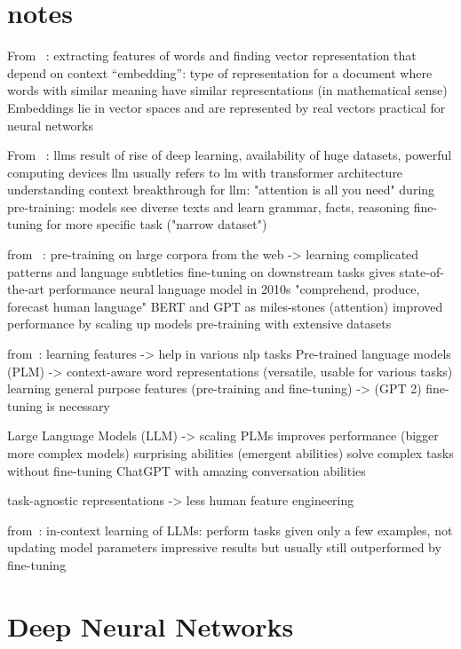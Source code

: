 \section{notes}
From ~\autocite{quadarLM2020}:
extracting features of words and finding vector representation that depend on context
\enquote{embedding}: type of representation for a document where words with similar meaning have similar representations (in mathematical sense)
Embeddings lie in vector spaces and are represented by real vectors
practical for neural networks

From ~\autocite{Hadi_2023}:
\gls{llm}s result of rise of deep learning, availability of huge datasets, powerful computing devices
\gls{llm} usually refers to lm with transformer architecture
understanding context
breakthrough for llm: "attention is all you need"
during pre-training: models see diverse texts and learn grammar, facts, reasoning
fine-tuning for more specific task ("narrow dataset")

from ~\autocite{Raiaan2024ARO}:
pre-training on large corpora from the web -> learning complicated patterns and language subtleties
fine-tuning on downstream tasks gives state-of-the-art performance
neural language model in 2010s
"comprehend, produce, forecast human language"
BERT and GPT as miles-stones (attention)
improved performance by scaling up models
pre-training with extensive datasets

from~\autocite{zhao2023survey}:
learning features -> help in various nlp tasks
Pre-trained language models (PLM) -> context-aware word representations (versatile, usable for various tasks)
learning general purpose features (pre-training and fine-tuning) -> (GPT 2)
fine-tuning is necessary

Large Language Models (LLM) -> scaling PLMs improves performance (bigger more complex models)
surprising abilities (emergent abilities)
solve complex tasks without fine-tuning
ChatGPT with amazing conversation abilities

task-agnostic representations -> less human feature engineering

from~\autocite{bhatia2023tart}:
in-context learning of LLMs: perform tasks given only a few examples, not updating model parameters
impressive results but usually still outperformed by fine-tuning

\section{Deep Neural Networks}\label{sec:dnn}

